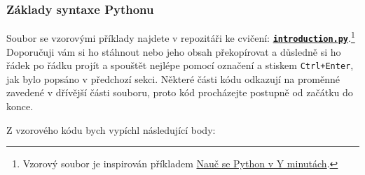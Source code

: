 \documentclass[a4paper,11pt,twoside]{article}
\def\code#1{\textnormal{\texttt{#1}}}
\def\ghfile#1#2{\textnormal{\textbf{\texttt{\href{https://github.com/PavelStransky/PCInPhysics/blob/main/#1#2}{#2}}}}}
\theoremstyle{red}
\theoremstyle{green}
\begin{document}
\subsubsection{Základy syntaxe Pythonu}
    Soubor se vzorovými příklady najdete v repozitáři ke cvičení: \ghfile{python/basics/}{introduction.py}.\footnote{
        Vzorový soubor je inspirován příkladem \href{https://learnxinyminutes.com/docs/cs-cz/python/}{Nauč se Python v Y minutách}.
    }
    Doporučuji vám si ho stáhnout nebo jeho obsah překopírovat a důsledně si ho řádek po řádku projít a spouštět nejlépe pomocí označení a stiskem \code{Ctrl+Enter}, jak bylo popsáno v předchozí sekci.
    Některé části kódu odkazují na proměnné zavedené v dřívější části souboru, proto kód procházejte postupně od začátku do konce.

    Z vzorového kódu bych vypíchl následující body:
\end{document}
